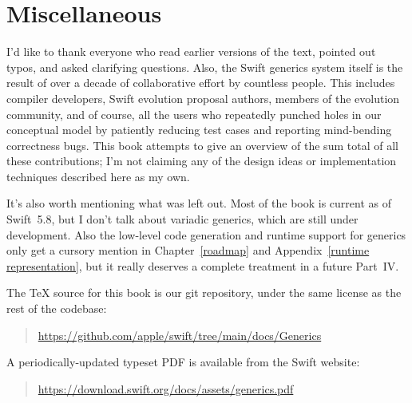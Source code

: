 \documentclass[../generics]{subfiles}
\begin{document}
\section*{Miscellaneous}

I'd like to thank everyone who read earlier versions of the text, pointed out typos, and asked clarifying questions. Also, the Swift generics system itself is the result of over a decade of collaborative effort by countless people. This includes compiler developers, Swift evolution proposal authors, members of the evolution community, and of course, all the users who repeatedly punched holes in our conceptual model by patiently reducing test cases and reporting mind-bending correctness bugs. This book attempts to give an overview of the sum total of all these contributions; I'm not claiming any of the design ideas or implementation techniques described here as my own.

It's also worth mentioning what was left out. Most of the book is current as of Swift~5.8, but I don't talk about variadic generics, which are still under development. Also the low-level code generation and runtime support for generics only get a cursory mention in Chapter~\ref{roadmap} and Appendix~\ref{runtime representation}, but it really deserves a complete treatment in a future Part~IV.

The \TeX{} source for this book is our git repository, under the same license as the rest of the codebase:
\begin{quote}
\url{https://github.com/apple/swift/tree/main/docs/Generics}
\end{quote}
A periodically-updated typeset PDF is available from the Swift website:
\begin{quote}
\url{https://download.swift.org/docs/assets/generics.pdf}
\end{quote}
\end{document}
